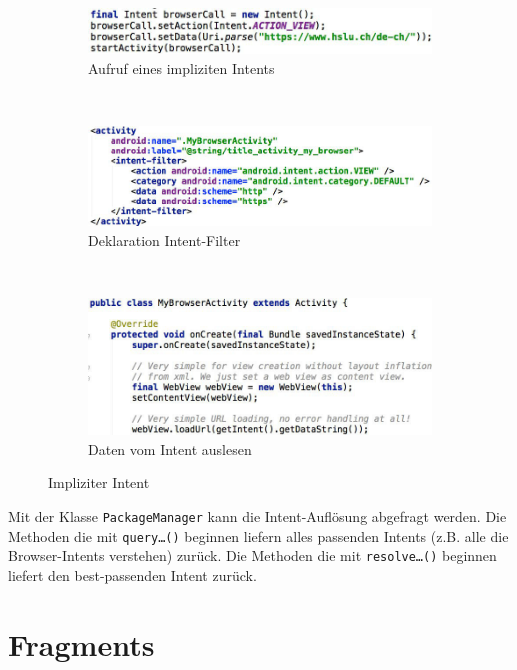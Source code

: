 \begin{figure}
	\centering
	\begin{subfigure}[b]{0.48\textwidth}
		\includegraphics[width=\textwidth]{fig/impliziter-intent-aufruf}
		\caption{Aufruf eines impliziten Intents}
	\end{subfigure}
	~
	\begin{subfigure}[b]{0.48\textwidth}
		\includegraphics[width=\textwidth]{fig/impliziter-intent-xml}
		\caption{Deklaration Intent-Filter}
	\end{subfigure}
	~
	\begin{subfigure}[b]{0.48\textwidth}
		\includegraphics[width=\textwidth]{fig/impliziter-intent-activity}
		\caption{Daten vom Intent auslesen}
	\end{subfigure}
	\caption{Impliziter Intent}
	\label{fig:impliziter-intent}
\end{figure}
Mit der Klasse \texttt{PackageManager} kann die  Intent-Auflösung abgefragt werden. Die Methoden die mit \texttt{query\dots()} beginnen liefern alles passenden Intents (z.B. alle die Browser-Intents verstehen) zurück. Die Methoden die mit \texttt{resolve\dots()} beginnen liefert den best-passenden Intent zurück.

\section{Fragments}

